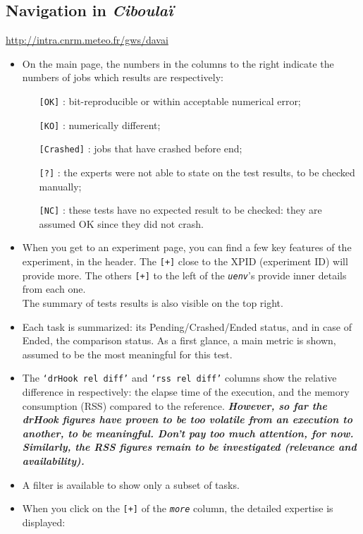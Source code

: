 \documentclass[a4paper,10pt,twoside]{article}
\begin{document}
\subsection{Navigation in \textit{Ciboulaï}\label{sect:ciboulai_navigation}}
\href{http://intra.cnrm.meteo.fr/gws/davai}{http://intra.cnrm.meteo.fr/gws/davai}
\begin{itemize}
 \item On the main page, the numbers in the columns to the right indicate the numbers of jobs which results are respectively:
 \begin{itemize}
  \item[\texttt{[OK]}] : bit-reproducible or within acceptable numerical error;
  \item[\texttt{[KO]}] : numerically different;
  \item[\texttt{[Crashed]}] : jobs that have crashed before end;
  \item[\texttt{[?]}] : the experts were not able to state on the test results, to be checked manually;
  \item[\texttt{[NC]}] : these tests have no expected result to be checked: they are assumed OK since they did not crash.
 \end{itemize}
 \item When you get to an experiment page, you can find a few key features of the experiment, in the header. The \texttt{[+]} close to the XPID (experiment ID) will provide more. The others \texttt{[+]} to the left of the \textit{\texttt{uenv}}'s provide inner details from each one.\\
 The summary of tests results is also visible on the top right.
 \item Each task is summarized: its Pending/Crashed/Ended status, and in case of Ended, the comparison status. As a first glance, a main metric is shown, assumed to be the most meaningful for this test.
 \item The \texttt{`drHook rel diff'} and \texttt{`rss rel diff'} columns show the relative difference in respectively: the elapse time of the execution, and the memory consumption (RSS) compared to the reference. \textit{\textbf{However, so far the drHook figures have proven to be too volatile from an execution to another, to be meaningful. Don't pay too much attention, for now. Similarly, the RSS figures remain to be investigated (relevance and availability).}}
 \item A filter is available to show only a subset of tasks.
 \item When you click on the \texttt{[+]} of the \textit{\texttt{more}} column, the detailed expertise is displayed:

\end{itemize}
\end{document}
